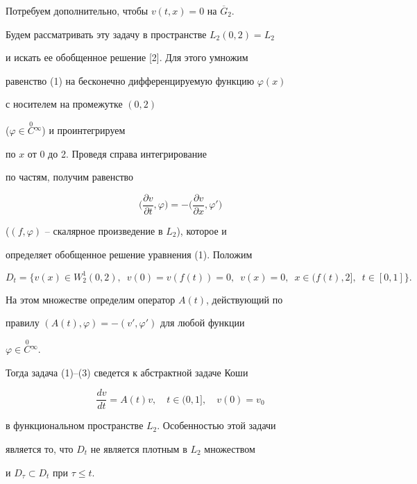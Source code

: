Потребуем дополнительно, чтобы $v(t,x)=0$ на $\overline G_2$.





Будем рассматривать эту задачу в пространстве $L_2(0,2)=L_2$


и искать ее обобщенное решение [2]. Для этого умножим


равенство (1) на бесконечно дифференцируемую функцию $\varphi(x)$


с носителем на промежутке $(0,2)$


($\varphi\in\overset{0}{C}{}^\infty$) и проинтегрируем


по $x$ от 0 до 2. Проведя справа интегрирование


по частям, получим равенство


\begin{equation}


\biggl(\frac{\partial v}{\partial t},\varphi\biggr)=


-\biggl(\frac{\partial v}{\partial x},\varphi' \biggr)


\end{equation}


($(f,\varphi)$ -- скалярное произведение в $L_2$), которое и


определяет обобщенное решение уравнения (1). Положим


$$


D_t=\{v(x)\in W^1_2(0,2), \ \;v(0)=v(f(t))=0,\ \;


v(x)=0,\ \; x\in (f(t),2],\ \; t\in [0,1]\}.


$$


На этом множестве определим оператор $A(t)$, действующий по


правилу $(A(t),\varphi)=-(v',\varphi')$ для любой функции


$\varphi\in\overset{0}{C}{}^\infty$.


Тогда задача (1)--(3) сведется к абстрактной задаче Коши


\begin{equation}


\frac{dv}{dt}=A(t)v,\quad t\in (0,1],\quad v(0)=v_0


\end{equation}


в функциональном пространстве $L_2$. Особенностью этой задачи


является то, что $D_t$ не является плотным в $L_2$ множеством


и $D_\tau\subset D_t$ при $\tau\le t$.





